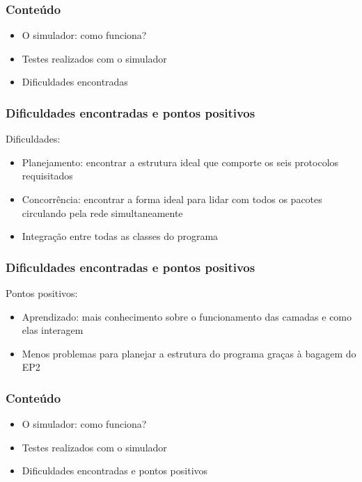 \documentclass{beamer}
\begin{document}
\begin{frame}
	\frametitle{Conteúdo}
	\begin{itemize}
		\item \textcolor{covered}{O simulador: como funciona?}
		\item \textcolor{covered}{Testes realizados com o simulador}
		\item Dificuldades encontradas
	\end{itemize}
\end{frame}

\begin{frame}
	\frametitle{Dificuldades encontradas e pontos positivos}
	Dificuldades:
	\begin{itemize}
		\item Planejamento: encontrar a estrutura ideal que comporte os seis protocolos requisitados
		\item Concorrência: encontrar a forma ideal para lidar com todos os pacotes circulando pela rede simultaneamente
		\item Integração entre todas as classes do programa
	\end{itemize}
\end{frame}

\begin{frame}
	\frametitle{Dificuldades encontradas e pontos positivos}
	Pontos positivos:
	\begin{itemize}
		\item Aprendizado: mais conhecimento sobre o funcionamento das camadas e como elas interagem
		\item Menos problemas para planejar a estrutura do programa graças à bagagem do EP2
	\end{itemize}
\end{frame}

\begin{frame}
	\frametitle{Conteúdo}
	\begin{itemize}
		\item \textcolor{covered}{O simulador: como funciona?}
		\item \textcolor{covered}{Testes realizados com o simulador}
		\item \textcolor{covered}{Dificuldades encontradas e pontos positivos}
	\end{itemize}
\end{frame}
\end{document}
